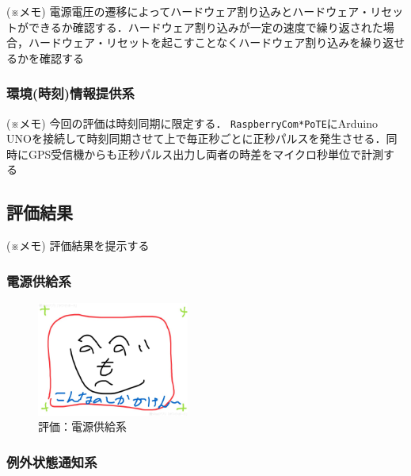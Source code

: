 {(※メモ) 電源電圧の遷移によってハードウェア割り込みとハードウェア・リセットができるか確認する．ハードウェア割り込みが一定の速度で繰り返された場合，ハードウェア・リセットを起こすことなくハードウェア割り込みを繰り返せるかを確認する


\subsubsection{環境(時刻)情報提供系}
\vspace{-0.5zh}


(※メモ) 今回の評価は時刻同期に限定する． {\tt Raspberry\-Com*PoTE}にArduino UNOを接続して時刻同期させて上で毎正秒ごとに正秒パルスを発生させる．同時にGPS受信機からも正秒パルス出力し両者の時差をマイクロ秒単位で計測する



\subsection{評価結果}
\vspace{-0.5zh}

(※メモ) 評価結果を提示する\\

\subsubsection{電源供給系}
\vspace{-0.5zh}

\vspace{-1zh}
\begin{figure}[H]
\centering
\includegraphics[width=5cm]{figspics/henoheno.jpeg}
\caption{評価：電源供給系}
\label{hohno:Eval-RaspberryComPoTE-Po}
\end{figure}
\vspace{-1zh}


\subsubsection{例外状態通知系}
\vspace{-0.5zh}

}
